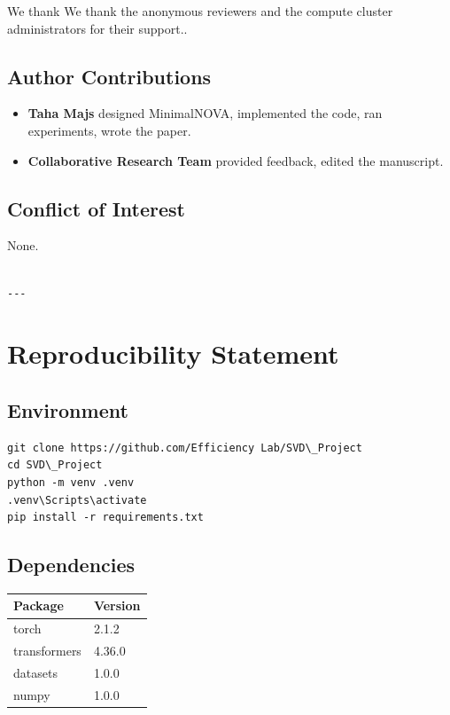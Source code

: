 We thank We thank the anonymous reviewers and the compute cluster administrators for their support..

\subsection{Author Contributions}

\begin{itemize}
\item \textbf{Taha Majs} designed MinimalNOVA, implemented the code, ran experiments,
  wrote the paper.
\item \textbf{Collaborative Research Team} provided feedback, edited the manuscript.

\end{itemize}
\subsection{Conflict of Interest}

None.
\begin{lstlisting}

---
\end{lstlisting}


\section{Reproducibility Statement}

\subsection{Environment}

\begin{lstlisting}
git clone https://github.com/Efficiency Lab/SVD\_Project
cd SVD\_Project
python -m venv .venv
.venv\Scripts\activate
pip install -r requirements.txt
\end{lstlisting}

\subsection{Dependencies}

\begin{table}[H]
\centering
\small
\begin{tabular}{ll}
\toprule
\textbf{Package} & \textbf{Version} \\
\midrule
torch & 2.1.2 \\
transformers & 4.36.0 \\
datasets & 1.0.0 \\
numpy & 1.0.0 \\
\bottomrule
\end{tabular}
\end{table}

